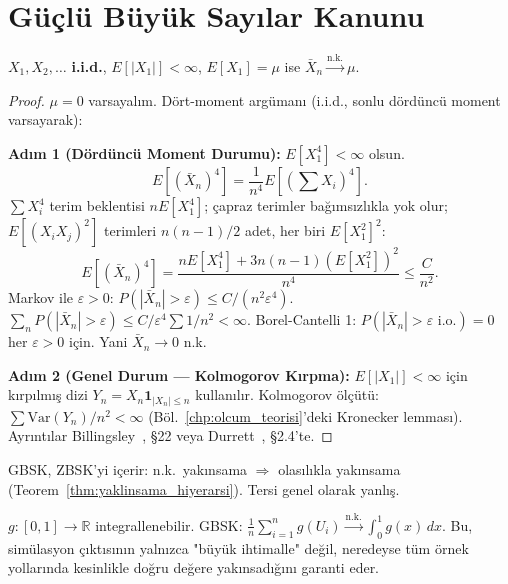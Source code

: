\section{Güçlü Büyük Sayılar Kanunu}
\label{sec:gbsk}

\begin{teorem}
\label{thm:gbsk}
$X_1, X_2, \ldots$ \textbf{i.i.d.}, $E[|X_1|] < \infty$, $E[X_1] = \mu$ ise
$\bar{X}_n \xrightarrow{\text{n.k.}} \mu$.
\end{teorem}

\begin{proof}
$\mu = 0$ varsayalım. Dört-moment argümanı (i.i.d., sonlu dördüncü moment varsayarak):

\textbf{Adım 1 (Dördüncü Moment Durumu):} $E[X_1^4] < \infty$ olsun.
\[
  E[(\bar{X}_n)^4] = \frac{1}{n^4} E\!\left[\left(\sum X_i\right)^4\right].
\]
$\sum X_i^4$ terim beklentisi $nE[X_1^4]$; çapraz terimler bağımsızlıkla yok olur;
$E[(X_i X_j)^2]$ terimleri $n(n-1)/2$ adet, her biri $E[X_1^2]^2$:
\[
  E[(\bar{X}_n)^4] = \frac{nE[X_1^4] + 3n(n-1)(E[X_1^2])^2}{n^4} \leq \frac{C}{n^2}.
\]
Markov ile $\varepsilon > 0$: $P(|\bar{X}_n| > \varepsilon) \leq C/(n^2\varepsilon^4)$.
$\sum_n P(|\bar{X}_n| > \varepsilon) \leq C/\varepsilon^4 \sum 1/n^2 < \infty$.
Borel-Cantelli 1: $P(|\bar{X}_n| > \varepsilon \text{ i.o.}) = 0$ her $\varepsilon > 0$ için.
Yani $\bar{X}_n \to 0$ n.k.

\textbf{Adım 2 (Genel Durum --- Kolmogorov Kırpma):}
$E[|X_1|] < \infty$ için kırpılmış dizi $Y_n = X_n \mathbf{1}_{|X_n|\leq n}$ kullanılır.
Kolmogorov ölçütü: $\sum \mathrm{Var}(Y_n)/n^2 < \infty$ (Böl.~\ref{chp:olcum_teorisi}'deki
Kronecker lemması). Ayrıntılar Billingsley~\cite{Billingsley1995}, §22 veya Durrett~\cite{Durrett2019}, §2.4'te.
\end{proof}

\begin{teorem}
\label{thm:gbsk_zbsk}
GBSK, ZBSK'yi içerir: n.k.\ yakınsama $\Rightarrow$ olasılıkla yakınsama
(Teorem~\ref{thm:yaklinsama_hiyerarsi}). Tersi genel olarak yanlış.
\end{teorem}

\begin{ornek}
$g : [0,1] \to \mathbb{R}$ integrallenebilir. GBSK:
$\frac{1}{n}\sum_{i=1}^n g(U_i) \xrightarrow{\text{n.k.}} \int_0^1 g(x)\,dx$.
Bu, simülasyon çıktısının yalnızca "büyük ihtimalle" değil,
neredeyse tüm örnek yollarında kesinlikle doğru değere yakınsadığını garanti eder.
\end{ornek}


